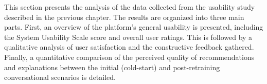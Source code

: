 This section presents the analysis of the data collected from the usability study described in the previous chapter. The results are organized into three main parts. First, an overview of the platform's general usability is presented, including the System Usability Scale score and overall user ratings. This is followed by a qualitative analysis of user satisfaction and the constructive feedback gathered. Finally, a quantitative comparison of the perceived quality of recommendations and explanations between the initial (cold-start) and post-retraining conversational scenarios is detailed.